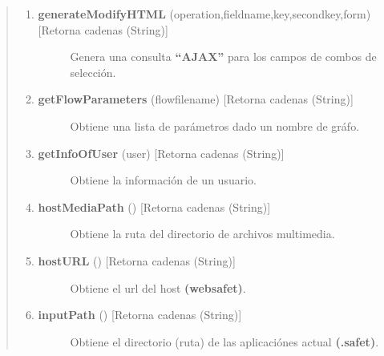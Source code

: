 \documentclass[letterpaper,11pt,spanish]{sphinxmanual}
\begin{document}
\begin{quote}
\begin{enumerate}
\begin{description}
\end{description}

\item {} \begin{description}
\item[{\textbf{generateModifyHTML} (operation,fieldname,key,secondkey,form) {[}Retorna cadenas (String){]}}] \leavevmode
Genera una consulta \textbf{``AJAX''} para los campos de combos de selección.

\end{description}

\item {} \begin{description}
\item[{\textbf{getFlowParameters} (flowfilename) {[}Retorna cadenas (String){]}}] \leavevmode
Obtiene una lista de parámetros dado un nombre de gráfo.

\end{description}

\item {} \begin{description}
\item[{\textbf{getInfoOfUser} (user) {[}Retorna cadenas (String){]}}] \leavevmode
Obtiene la información de un usuario.

\end{description}

\item {} \begin{description}
\item[{\textbf{hostMediaPath} () {[}Retorna cadenas (String){]}}] \leavevmode
Obtiene la ruta del directorio de archivos multimedia.

\end{description}

\item {} \begin{description}
\item[{\textbf{hostURL} () {[}Retorna cadenas (String){]}}] \leavevmode
Obtiene el url del host \textbf{(websafet)}.

\end{description}

\item {} \begin{description}
\item[{\textbf{inputPath} () {[}Retorna cadenas (String){]}}] \leavevmode
Obtiene el directorio (ruta) de las aplicaciónes actual \textbf{(.safet)}.


\end{description}
\end{enumerate}
\end{quote}
\end{document}
